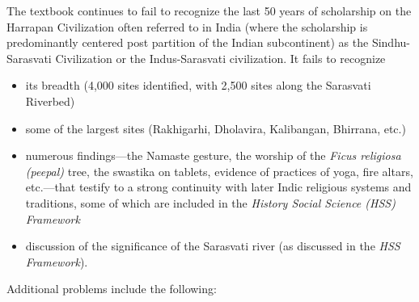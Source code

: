 The textbook continues to fail to recognize the last 50 years of scholarship on the Harrapan Civilization often referred to in India (where the scholarship is predominantly centered post partition of the Indian subcontinent) as the Sindhu-Sarasvati Civilization or the Indus-Sarasvati civilization. It fails to recognize
\begin{itemize} 
\item its breadth (4,000 sites identified, with 2,500 sites along the Sarasvati Riverbed)
\item some of the largest sites (Rakhigarhi, Dholavira, Kalibangan, Bhirrana, etc.)
\item numerous findings—the Namaste gesture, the worship of the \textit{Ficus religiosa (peepal)} tree, the swastika on tablets, evidence of practices of yoga, fire altars, etc.—that testify to a strong continuity with later Indic religious systems and traditions, some of which are included in the \textit{History Social Science (HSS) Framework}
\item discussion of the significance of the Sarasvati river (as discussed in the \textit{HSS Framework}).
\end{itemize}
Additional problems include the following:
